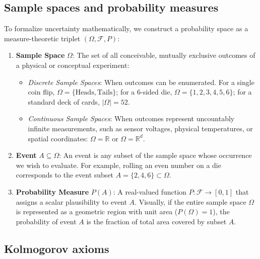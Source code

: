 \subsection{Sample spaces and probability measures}
\label{sec:sample_spaces_and_events}

To formalize uncertainty mathematically, we construct a probability space as a measure-theoretic triplet $(\Omega, \mathcal{F}, P)$:
\begin{enumerate}
  \item \textbf{Sample Space} $\Omega$: The set of all conceivable, mutually exclusive outcomes of a physical or conceptual experiment:
  \begin{itemize}[noitemsep]
    \item \emph{Discrete Sample Spaces}: When outcomes can be enumerated. For a single coin flip, $\Omega = \{\text{Heads}, \text{Tails}\}$; for a 6-sided die, $\Omega = \{1, 2, 3, 4, 5, 6\}$; for a standard deck of cards, $|\Omega| = 52$.
    \item \emph{Continuous Sample Spaces}: When outcomes represent uncountably infinite measurements, such as sensor voltages, physical temperatures, or spatial coordinates: $\Omega = \mathbb{R}$ or $\Omega = \mathbb{R}^d$.
  \end{itemize}
  \item \textbf{Event} $A \subseteq \Omega$: An event is any subset of the sample space whose occurrence we wish to evaluate. For example, rolling an even number on a die corresponds to the event subset $A = \{2, 4, 6\} \subset \Omega$.
  \item \textbf{Probability Measure} $P(A)$: A real-valued function $P: \mathcal{F} \to [0, 1]$ that assigns a scalar plausibility to event $A$. Visually, if the entire sample space $\Omega$ is represented as a geometric region with unit area ($P(\Omega) = 1$), the probability of event $A$ is the fraction of total area covered by subset $A$.
\end{enumerate}

\subsection{Kolmogorov axioms}
\label{sec:kolmogorov_axioms}

